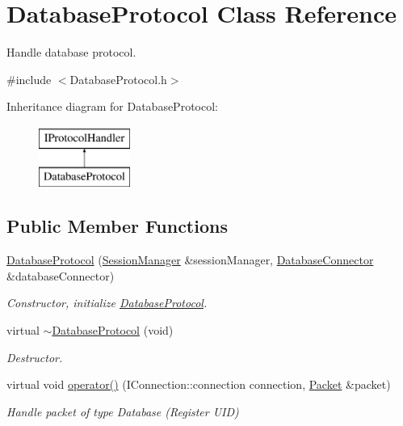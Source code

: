 \hypertarget{class_database_protocol}{\section{Database\-Protocol Class Reference}
\label{class_database_protocol}
}


Handle database protocol.  




{\ttfamily \#include $<$Database\-Protocol.\-h$>$}

Inheritance diagram for Database\-Protocol\-:\begin{figure}[H]
\begin{center}
\leavevmode
\includegraphics[height=2.000000cm]{class_database_protocol}
\end{center}
\end{figure}
\subsection*{Public Member Functions}
\begin{DoxyCompactItemize}
\item 
\hyperlink{class_database_protocol_a00f6196e9019334c51b9659469537eca}{Database\-Protocol} (\hyperlink{class_session_manager}{Session\-Manager} \&session\-Manager, \hyperlink{class_database_connector}{Database\-Connector} \&database\-Connector)
\begin{DoxyCompactList}\small\item\em Constructor, initialize \hyperlink{class_database_protocol}{Database\-Protocol}. \end{DoxyCompactList}\item 
\hypertarget{class_database_protocol_a61c224614f329a4a2052998b02557848}{virtual \hyperlink{class_database_protocol_a61c224614f329a4a2052998b02557848}{$\sim$\-Database\-Protocol} (void)}\label{class_database_protocol_a61c224614f329a4a2052998b02557848}

\begin{DoxyCompactList}\small\item\em Destructor. \end{DoxyCompactList}\item 
virtual void \hyperlink{class_database_protocol_af42a4c8a0aeee9defe8b8313657af019}{operator()} (I\-Connection\-::connection connection, \hyperlink{class_packet}{Packet} \&packet)
\begin{DoxyCompactList}\small\item\em Handle packet of type Database (Register U\-I\-D) \end{DoxyCompactList}\end{DoxyCompactItemize}


